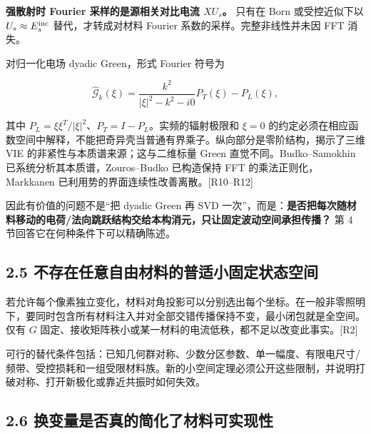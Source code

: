 \documentclass[11pt,a4paper]{article}
\begin{document}
\textbf{强散射时 Fourier 采样的是源相关对比电流 \(XU_s\)。} 只有在 Born
或受控近似下以 \(U_s\approx E_s^{\rm inc}\) 替代，才转成对材料 Fourier
系数的采样。完整非线性并未因 FFT 消失。

对归一化电场 dyadic Green，形式 Fourier 符号为

\[
\widehat{\mathcal G}_k(\xi)
=\frac{k^2}{|\xi|^2-k^2-i0}P_T(\xi)-P_L(\xi),
\]

其中 \(P_L=\xi\xi^T/|\xi|^2\)、\(P_T=I-P_L\)。实频的辐射极限和 \(\xi=0\)
的约定必须在相应函数空间中解释，不能把奇异壳当普通有界乘子。纵向部分是零阶结构，揭示了三维
VIE 的非紧性与本质谱来源；这与二维标量 Green 直觉不同。Budko--Samokhin
已系统分析其本质谱，Zouros--Budko 已构造保持 FFT 的乘法正则化，Markkanen
已利用势的界面连续性改善离散。{[}R10--R12{]}

因此有价值的问题不是``把 dyadic Green 再 SVD
一次''，而是：\textbf{是否把每次随材料移动的电荷/法向跳跃结构交给本构消元，只让固定波动空间承担传播？}
第 4 节回答它在何种条件下可以精确陈述。

\hypertarget{ux4e0dux5b58ux5728ux4efbux610fux81eaux7531ux6750ux6599ux7684ux666eux9002ux5c0fux56faux5b9aux72b6ux6001ux7a7aux95f4}{%
\subsection{2.5
不存在任意自由材料的普适小固定状态空间}\label{ux4e0dux5b58ux5728ux4efbux610fux81eaux7531ux6750ux6599ux7684ux666eux9002ux5c0fux56faux5b9aux72b6ux6001ux7a7aux95f4}}

若允许每个像素独立变化，材料对角投影可以分别选出每个坐标。在一般非零照明下，要同时包含所有材料注入并对全部交错传播保持不变，最小闭包就是全空间。仅有
\(G\)
固定、接收矩阵秩小或某一材料的电流低秩，都不足以改变此事实。{[}R2{]}

可行的替代条件包括：已知几何群对称、少数分区参数、单一幅度、有限电尺寸/频带、受控损耗和一组受限材料族。新的小空间定理必须公开这些限制，并说明打破对称、打开新极化或靠近共振时如何失效。

\hypertarget{ux6362ux53d8ux91cfux662fux5426ux771fux7684ux7b80ux5316ux4e86ux6750ux6599ux53efux5b9eux73b0ux6027}{%
\subsection{2.6
换变量是否真的简化了材料可实现性}\label{ux6362ux53d8ux91cfux662fux5426ux771fux7684ux7b80ux5316ux4e86ux6750ux6599ux53efux5b9eux73b0ux6027}}
\end{document}

